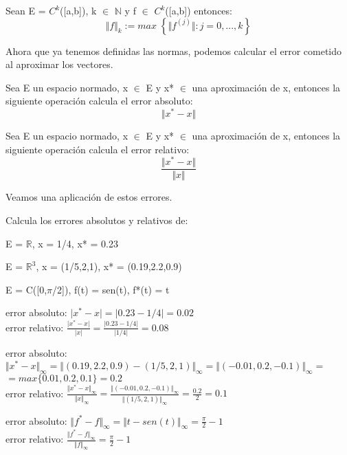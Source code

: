 \begin{ndef}
Sean E = $C^k$([a,b]), k $\in$ $\mathbb{N}$ y f $\in$ $C^k$([a,b]) entonces:
\[ \Vert f \Vert _k := max \; \left\lbrace \Vert f^{(j)} \Vert : j = 0,...,k \right\rbrace \]
\end{ndef}

Ahora que ya tenemos definidas las normas, podemos calcular el error cometido al aproximar los vectores.

\begin{ndef}
Sea E un espacio normado, x $\in$ E y x* $\in$ una aproximación de x, entonces la siguiente operación calcula el error absoluto:
\[ \Vert x^* - x \Vert \]
\end{ndef}

\begin{ndef}
Sea E un espacio normado, x $\in$ E y x* $\in$ una aproximación de x, entonces la siguiente operación calcula el error relativo:
\[  \frac {\Vert x^* - x \Vert}{ \Vert x \Vert} \]
\end{ndef}

Veamos una aplicación de estos errores.

\begin{ejer}
Calcula los errores absolutos y relativos de:
	\begin{nlist}
	\item E = $\mathbb{R}$, x = 1/4, x* = 0.23
	\item E = $\mathbb{R}^3$, x = (1/5,2,1), x* = (0.19,2.2,0.9)
	\item E = C([0,$\pi$/2]), f(t) = sen(t), f*(t) = t
	\end{nlist}
\end{ejer}

\begin{sol}
	\begin{nlist}
	\item error absoluto: $\vert x^* - x \vert = \vert 0.23 - 1/4 \vert = 0.02 $\\
	error relativo: $\frac{\vert x^* - x \vert}{\vert x \vert} = \frac{\vert 0.23 - 1/4 \vert}{\vert 1/4 \vert} = 0.08$
	\item error absoluto: $\Vert x^* - x \Vert _\infty = \Vert (0.19,2.2,0.9) - (1/5,2,1) \Vert _\infty = \Vert (-0.01,0.2,-0.1) \Vert _\infty =$\\ $= max \lbrace 0.01,0.2,0.1\rbrace = 0.2 $\\
	error relativo: $\frac{\Vert x^* - x \Vert _\infty}{\Vert x \Vert _\infty} = \frac{\Vert (-0.01,0.2,-0.1) \Vert _\infty}{\Vert (1/5,2,1) \Vert _\infty} = \frac{0.2}{2} = 0.1 $\\
	\item error absoluto: $\Vert f^* - f \Vert _\infty = \Vert t - sen(t) \Vert _\infty = \frac{\pi}{2} - 1$\\
	error relativo: $\frac{\Vert f^* - f \Vert _\infty}{\Vert f \Vert _\infty} = \frac{\pi}{2} - 1 $
	\end{nlist}
\end{sol}

